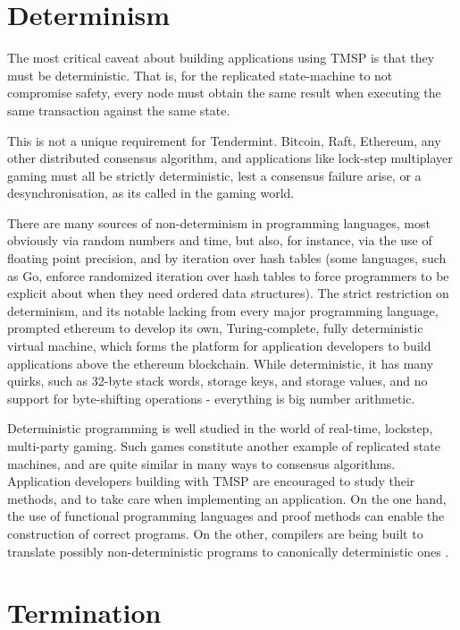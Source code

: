 \section{Determinism}

The most critical caveat about building applications using TMSP is that they must be deterministic.
That is, for the replicated state-machine to not compromise safety, 
every node must obtain the same result when executing the same transaction against the same state.

This is not a unique requirement for Tendermint. Bitcoin, Raft, Ethereum, any other distributed consensus algorithm,
and applications like lock-step multiplayer gaming must all be strictly deterministic, lest a consensus failure arise,
or a desynchronisation, as its called in the gaming world.

There are many sources of non-determinism in programming languages, most obviously via random numbers and time,
but also, for instance, via the use of floating point precision, and by iteration over hash tables 
(some languages, such as Go, enforce randomized iteration over hash tables to force programmers to be explicit about when they need ordered data structures).
The strict restriction on determinism, and its notable lacking from every major programming language,
prompted ethereum to develop its own, Turing-complete, fully deterministic virtual machine,
which forms the platform for application developers to build applications above the ethereum blockchain.
While deterministic, it has many quirks, such as 32-byte stack words, storage keys, and storage values,
and no support for byte-shifting operations - everything is big number arithmetic.

Deterministic programming is well studied in the world of real-time, lockstep, multi-party gaming.
Such games constitute another example of replicated state machines, and are quite similar in many ways to consensus algorithms.
Application developers building with TMSP are encouraged to study their methods, and to take care when implementing an application.
On the one hand, the use of functional programming languages and proof methods can enable the construction of correct programs.
On the other, compilers are being built to translate possibly non-deterministic programs to canonically deterministic ones \cite{deterministicjs}.

\section{Termination}

